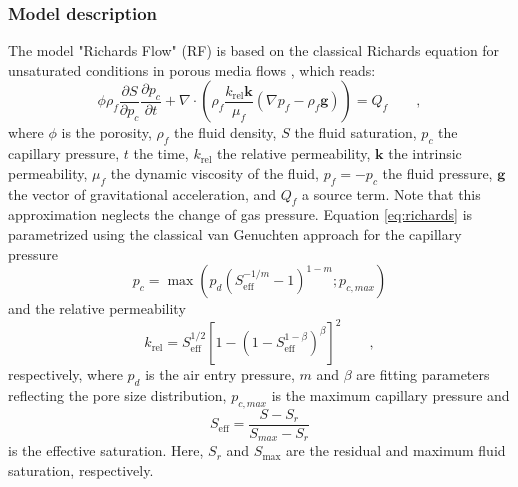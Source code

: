 \subsubsection{Model description}
\label{sec:model_RF}
The model "Richards Flow" (RF) is based on the classical Richards equation for unsaturated conditions in porous media flows \cite{richards1931}, which reads:
\begin{equation}\label{eq:richards}
\phi \rho_f \frac{\partial S}{\partial p_c}\frac{\partial p_c}{\partial t} + \nabla \cdot \left(\rho_f \frac{k_\text{rel}\textbf{k}}{\mu_f}(\nabla p_f-\rho_f \textbf{g})\right)= Q_f \qquad ,
\end{equation}
where $\phi$ is the porosity, $\rho_f$ the fluid density, $S$ the fluid saturation, $p_c$ the capillary pressure, $t$ the time, $k_\text{rel}$ the relative permeability, $\textbf{k}$ the intrinsic permeability, $\mu_f$ the dynamic viscosity of the fluid, $p_f=-p_c$ the fluid pressure, $\textbf{g}$ the vector of gravitational acceleration, and $Q_f$ a source term. Note that this approximation neglects the change of gas pressure. Equation \eqref{eq:richards} is parametrized using the classical van Genuchten approach  \cite{vangenuchten1980} for the capillary pressure
\begin{equation}\label{eq:cap_p}
p_c = \max \left(p_d\left(S_\text{eff}^{-1/m}-1\right)^{1-m};p_{c,max}\right)
\end{equation}
and the relative permeability 
\begin{equation}\label{eq:k_rel}
k_\text{rel}=S_\text{eff}^{1/2}\left[1-\left(1-S_\text{eff}^{1-\beta}\right)^\beta\right]^2 \qquad ,
\end{equation}
respectively, where $p_d$ is the air entry pressure, $m$ and $\beta$ are fitting parameters reflecting the pore size distribution, $p_{c,max}$ is the maximum capillary pressure and 
\begin{equation}
S_\text{eff}=\frac{S-S_r}{S_{max}-S_r}
\end{equation}
is the effective saturation. Here, $S_r$ and $S_\text{max}$ are the residual and maximum fluid saturation, respectively.

